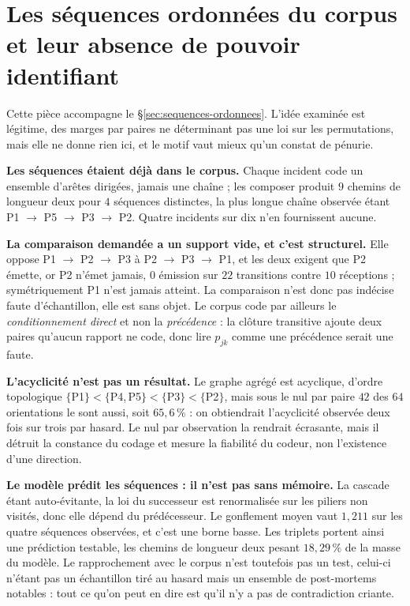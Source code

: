 \section{Les séquences ordonnées du corpus et leur absence de pouvoir identifiant}
\label{sec:ann-sequences}

Cette pièce accompagne le \S\ref{sec:sequences-ordonnees}. L'idée examinée est légitime, des marges
par paires ne déterminant pas une loi sur les permutations, mais elle ne donne rien ici, et le
motif vaut mieux qu'un constat de pénurie.

\textbf{Les séquences étaient déjà dans le corpus.} Chaque incident code un ensemble d'arêtes
dirigées, jamais une chaîne ; les composer produit $9$ chemins de longueur deux pour $4$ séquences
distinctes, la plus longue chaîne observée étant P1 $\to$ P5 $\to$ P3 $\to$ P2. Quatre incidents
sur dix n'en fournissent aucune.

\textbf{La comparaison demandée a un support vide, et c'est structurel.} Elle oppose
P1 $\to$ P2 $\to$ P3 à P2 $\to$ P3 $\to$ P1, et les deux exigent que P2 émette, or P2 n'émet
jamais, $0$ émission sur $22$ transitions contre $10$ réceptions ; symétriquement P1 n'est jamais
atteint. La comparaison n'est donc pas indécise faute d'échantillon, elle est sans objet. Le corpus
code par ailleurs le \emph{conditionnement direct} et non la \emph{précédence} : la clôture
transitive ajoute deux paires qu'aucun rapport ne code, donc lire $p_{jk}$ comme une précédence
serait une faute.

\textbf{L'acyclicité n'est pas un résultat.} Le graphe agrégé est acyclique, d'ordre topologique
$\{$P1$\} < \{$P4,\,P5$\} < \{$P3$\} < \{$P2$\}$, mais sous le nul par paire $42$ des $64$
orientations le sont aussi, soit $65{,}6\,\%$ : on obtiendrait l'acyclicité observée deux fois sur
trois par hasard. Le nul par observation la rendrait écrasante, mais il détruit la constance du
codage et mesure la fiabilité du codeur, non l'existence d'une direction.

\textbf{Le modèle prédit les séquences : il n'est pas sans mémoire.} La cascade étant
auto-évitante, la loi du successeur est renormalisée sur les piliers non visités, donc elle dépend
du prédécesseur. Le gonflement moyen vaut $1{,}211$ sur les quatre séquences observées, et c'est
une borne basse. Les triplets portent ainsi une prédiction testable, les chemins de longueur deux
pesant $18{,}29\,\%$ de la masse du modèle. Le rapprochement avec le corpus n'est toutefois pas un
test, celui-ci n'étant pas un échantillon tiré au hasard mais un ensemble de post-mortems
notables : tout ce qu'on peut en dire est qu'il n'y a pas de contradiction criante.

